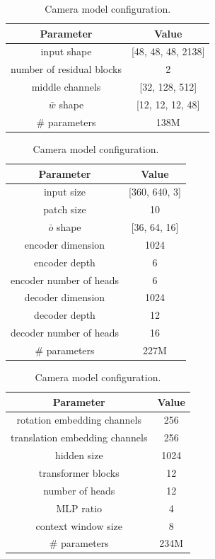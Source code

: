 \documentclass{article}
\theoremstyle{plain}
\theoremstyle{definition}
\theoremstyle{remark}
\begin{document}
\begin{table}[]
\centering
\scriptsize
\setlength{\tabcolsep}{4pt}

\begin{minipage}[t]{0.48\textwidth}
\centering

\caption{3D-VAE configuration.}
\label{table:w-vae}
\begin{tabular}{cc}\toprule
Parameter & Value \\
\midrule
input shape & [48, 48, 48, 2138] \\
number of residual blocks & 2 \\
middle channels & [32, 128, 512] \\
$\bar{w}$ shape & [12, 12, 12, 48] \\
\# parameters & 138M \\
\bottomrule
\end{tabular}

\vspace{0.8em}

\caption{2D-VAE configuration.}
\label{table:p-vae}
\begin{tabular}{cc}\toprule
Parameter & Value \\
\midrule
input size & [360, 640, 3] \\
patch size & 10 \\
$\bar{o}$ shape & [36, 64, 16] \\
encoder dimension & 1024 \\
encoder depth & 6 \\
encoder number of heads & 6 \\
decoder dimension & 1024 \\
decoder depth & 12 \\
decoder number of heads & 16 \\
\# parameters & 227M \\
\bottomrule
\end{tabular}

\vspace{0.8em}

\caption{Camera model configuration.}
\label{table:cam-model}
\begin{tabular}{cc}\toprule
Parameter & Value \\
\midrule
rotation embedding channels & 256 \\
translation embedding channels & 256 \\
hidden size & 1024 \\
transformer blocks & 12 \\
number of heads & 12 \\
MLP ratio & 4 \\
context window size & 8 \\
\# parameters & 234M \\
\bottomrule
\end{tabular}


\end{minipage}
\end{table}
\end{document}
